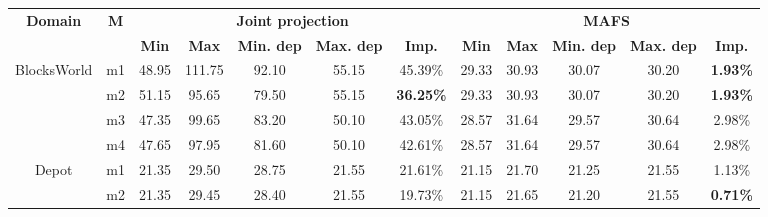 \documentclass{article}
\theoremstyle{remark}
\begin{document}
\begin{table}[ht]
\begin{tabular}{|c|c|c|c|c|c|c||c|c|c|c|c|}
\hline
\multirow{2}{*}{\textbf{Domain}} & \multirow{2}{*}{\textbf{M}} & \multicolumn{5}{c||}{\textbf{Joint projection}}                                       & \multicolumn{5}{c|}{\textbf{MAFS}}                                                    \\ \cline{3-12} 
                                 &                             & \textbf{Min} & \textbf{Max} & \textbf{Min. dep} & \textbf{Max. dep} & \textbf{Imp.}    & \textbf{Min} & \textbf{Max} & \textbf{Min. dep} & \textbf{Max. dep} & \textbf{Imp.}   \\ \hline
\multirow{4}{*}{BlocksWorld}     & m1                          & 48.95        & 111.75       & 92.10             & 55.15             & 45.39\%          & 29.33        & 30.93        & 30.07             & 30.20             & \textbf{1.93\%} \\ \cline{2-12} 
                                 & m2                          & 51.15        & 95.65        & 79.50             & 55.15             & \textbf{36.25\%} & 29.33        & 30.93        & 30.07             & 30.20             & \textbf{1.93\%} \\ \cline{2-12} 
                                 & m3                          & 47.35        & 99.65        & 83.20             & 50.10             & 43.05\%          & 28.57        & 31.64        & 29.57             & 30.64             & 2.98\%          \\ \cline{2-12} 
                                 & m4                          & 47.65        & 97.95        & 81.60             & 50.10             & 42.61\%          & 28.57        & 31.64        & 29.57             & 30.64             & 2.98\%          \\ \hline
\multirow{4}{*}{Depot}           & m1                          & 21.35        & 29.50        & 28.75             & 21.55             & 21.61\%          & 21.15        & 21.70        & 21.25             & 21.55             & 1.13\%          \\ \cline{2-12} 
                                 & m2                          & 21.35        & 29.45        & 28.40             & 21.55             & 19.73\%          & 21.15        & 21.65        & 21.20             & 21.55             & \textbf{0.71\%} \\ \cline{2-12} 

\end{tabular}
\end{table}
\end{document}
